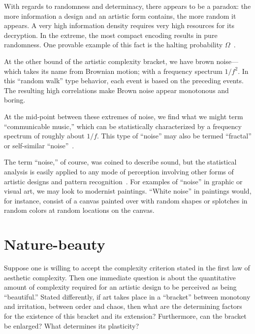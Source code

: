 \documentclass[rmp,amssymb,showpacs,showkeys,12pt,preprint]{revtex4}
\begin{document}
With regards to randomness and determinacy, there appears to be a paradox: the more information a design and an artistic form contains, the more random it appears.
A very high information density requires very high resources for its decryption.
In the extreme, the most compact encoding results in pure randomness.
One provable example of this fact is the halting probability $\Omega$~\cite{chaitin2,chaitin3,calude:02}.


At the other bound of the artistic complexity bracket, we have brown noise---which takes its name from Brownian motion;
with a frequency spectrum $1/f^2$.
In this ``random walk'' type behavior, each event is based on the preceding events.
The resulting high correlations make Brown noise appear monotonous and boring.


At the mid-point between these extremes of noise, we find what we might term
``communicable music,'' which can be statistically characterized by a frequency spectrum of roughly about $1/f$.
This type of ``noise'' may also be termed ``fractal'' or self-similar ``noise''~\cite{voss-75,voss-78,gard-78,taylor-99}.


The term ``noise,'' of course, was coined to describe sound, but the
statistical analysis is easily applied to any mode of perception involving other forms of artistic designs and
pattern recognition~\cite{bovill}. For examples of ``noise'' in graphic or visual art, we
may look to modernist paintings. ``White noise'' in paintings would, for instance, consist of a canvas painted over with random shapes or splotches in random
colors at random locations on the canvas.



\section{Nature-beauty}

Suppose one is willing to accept the complexity criterion stated in the first law of aesthetic complexity.
Then one immediate question is about the quantitative amount of complexity required for an artistic design to be perceived as being ``beautiful.''
Stated differently, if art takes place in a ``bracket'' between monotony and irritation, between order and chaos, then what are the determining factors for the existence of this bracket and its extension?
Furthermore, can the bracket be enlarged? What determines its plasticity?
\end{document}
